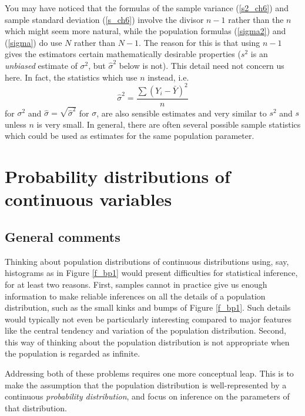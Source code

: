 You may have noticed that the formulas of the sample variance
(\ref{s2_ch6}) and sample standard deviation (\ref{s_ch6}) involve the
divisor $n-1$ rather than the $n$ which might seem more natural, while
the population formulas (\ref{sigma2}) and (\ref{sigma}) do use $N$
rather than $N-1$. The reason for this is that using $n-1$ gives the
estimators certain mathematically desirable properties ($s^{2}$ is an \emph{unbiased} estimate of $\sigma^{2}$, but
$\hat{\sigma}^{2}$ below is not). This detail need not concern us here.
In fact, the statistics which use $n$ instead, i.e.\
\begin{equation}
\hat{\sigma}^{2}=\frac{\sum (Y_{i}-\bar{Y})^{2}}{n}
\label{s2b}
\end{equation}
for $\sigma^{2}$ and $\hat{\sigma}=\sqrt{\hat{\sigma}^{2}}$ for
$\sigma$, are also sensible estimates and very similar to
$s^{2}$ and $s$ unless $n$ is very small. In general, there are often
several possible sample statistics which could be used as estimates for
the same population parameter.

\section{Probability distributions of continuous variables}
\label{s_contd_probdistrs}

\subsection{General comments}
\label{ss_contd_probdistrs_general}

Thinking about population distributions of continuous distributions
using, say, histograms as in Figure \ref{f_bp1} would present
difficulties for statistical inference, for at least two reasons. First,
samples cannot in practice give us enough information to make reliable
inferences on all the details of a population distribution, such as the
small kinks and bumps of Figure \ref{f_bp1}. Such details would
typically not even be particularly interesting compared to major
features like the central tendency and variation of the population
distribution. Second, this way of thinking about the population
distribution is not appropriate when the population is regarded as
infinite.

Addressing both of these problems requires one more conceptual leap.
This is to make the assumption that the population distribution is
well-represented by a continuous \emph{probability distribution}, and
focus on inference on the parameters of that distribution.

